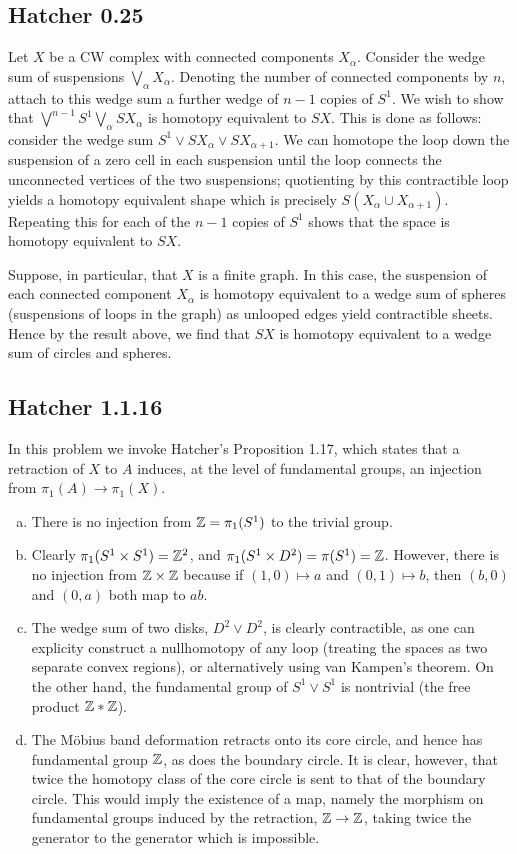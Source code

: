 \documentclass{../mathnotes}
\begin{document}
\subsection*{Hatcher 0.25}
Let $X$ be a CW complex with connected components $X_\alpha$. Consider the wedge sum of suspensions
$\bigvee_\alpha X_\alpha$. Denoting the number of connected components by $n$, attach to this wedge sum
a further wedge of $n-1$ copies of $S^1$. We wish to show that $\bigvee^{n-1} S^1\bigvee_\alpha SX_\alpha$
is homotopy equivalent to $SX$. This is done as follows: consider the wedge sum $S^1\vee SX_\alpha\vee SX_{\alpha+1}$.
We can homotope the loop down the suspension of a zero cell in each suspension until the loop connects the
unconnected vertices of the two suspensions; quotienting by this contractible loop yields a homotopy equivalent
shape which is precisely $S(X_\alpha\cup X_{\alpha+1})$. Repeating this for each of the $n-1$ copies of $S^1$
shows that the space is homotopy equivalent to $SX$.

Suppose, in particular, that $X$ is a finite graph. In this case, the suspension of each connected component
$X_\alpha$ is homotopy equivalent to a wedge sum of spheres (suspensions of loops in the graph) as unlooped
edges yield contractible sheets. Hence by the result above, we find that $SX$ is homotopy equivalent to a wedge
sum of circles and spheres.


\subsection*{Hatcher 1.1.16}
In this problem we invoke Hatcher's Proposition 1.17, which states that a retraction of $X$ to $A$
induces, at the level of fundamental groups, an injection from $\pi_1(A)\to\pi_1(X)$.
\begin{enumerate}[(a)]
    \item There is no injection from $\mathbb{Z}=\pi_1(S^1)$ to the trivial group.
    \item Clearly $\pi_1(S^1\times S^1)=\mathbb{Z}^2$, and $\pi_1(S^1\times D^2)=\pi(S^1)=\mathbb{Z}$. However,
        there is no injection from $\mathbb{Z}\times\mathbb{Z}$ because if $(1,0)\mapsto a$ and $(0,1)\mapsto b$,
        then $(b,0)$ and $(0,a)$ both map to $ab$.
    \item The wedge sum of two disks, $D^2\vee D^2$, is clearly contractible, as one can explicity
        construct a nullhomotopy of any loop (treating the spaces as two separate convex regions),
        or alternatively using van Kampen's theorem. On the other hand, the fundamental group of $S^1\vee S^1$
        is nontrivial (the free product $\mathbb{Z}*\mathbb{Z}$).
    \item The M\"obius band deformation retracts onto its core circle, and hence has fundamental group $\mathbb{Z}$,
        as does the boundary circle. It is clear, however, that twice the homotopy class of the core circle is
        sent to that of the boundary circle. This would imply the existence of a map, namely the morphism on
        fundamental groups induced by the retraction, $\mathbb{Z}\to\mathbb{Z}$, taking twice the generator to the generator
        which is impossible.
\end{enumerate}
\end{document}
